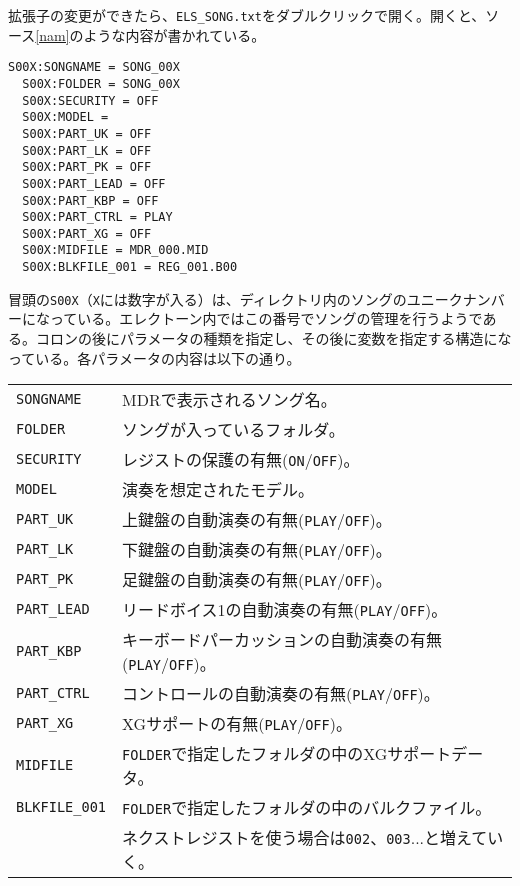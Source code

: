 \documentclass[uplatex, 10pt, dvipdfmx]{jsarticle}
\numberwithin{equation}{section}
\begin{document}
拡張子の変更ができたら、\texttt{ELS_SONG.txt}をダブルクリックで開く。開くと、ソース\ref{nam}のような内容が書かれている。
\begin{lstlisting}[caption=ELS\_SONG.NAM（変更前）, label=nam]
  S00X:SONGNAME = SONG_00X 
  S00X:FOLDER = SONG_00X 
  S00X:SECURITY = OFF 
  S00X:MODEL =  
  S00X:PART_UK = OFF 
  S00X:PART_LK = OFF 
  S00X:PART_PK = OFF 
  S00X:PART_LEAD = OFF 
  S00X:PART_KBP = OFF 
  S00X:PART_CTRL = PLAY 
  S00X:PART_XG = OFF 
  S00X:MIDFILE = MDR_000.MID 
  S00X:BLKFILE_001 = REG_001.B00 
\end{lstlisting}
冒頭の\texttt{S00X}（\texttt{X}には数字が入る）は、ディレクトリ内のソングのユニークナンバーになっている。エレクトーン内ではこの番号でソングの管理を行うようである。コロンの後にパラメータの種類を指定し、その後に変数を指定する構造になっている。各パラメータの内容は以下の通り\cite{elspc}。\\

\begin{tabular}{ll}
\texttt{SONGNAME} & MDRで表示されるソング名。 \\
\texttt{FOLDER} & ソングが入っているフォルダ。　\\
\texttt{SECURITY} & レジストの保護の有無(\texttt{ON}/\texttt{OFF})。\\
\texttt{MODEL} & 演奏を想定されたモデル。\\
\texttt{PART_UK} & 上鍵盤の自動演奏の有無(\texttt{PLAY}/\texttt{OFF})。\\
\texttt{PART_LK} & 下鍵盤の自動演奏の有無(\texttt{PLAY}/\texttt{OFF})。\\
\texttt{PART_PK} & 足鍵盤の自動演奏の有無(\texttt{PLAY}/\texttt{OFF})。\\
\texttt{PART_LEAD} & リードボイス1の自動演奏の有無(\texttt{PLAY}/\texttt{OFF})。\\
\texttt{PART_KBP} & キーボードパーカッションの自動演奏の有無(\texttt{PLAY}/\texttt{OFF})。\\
\texttt{PART_CTRL} & コントロールの自動演奏の有無(\texttt{PLAY}/\texttt{OFF})。\\
\texttt{PART_XG} & XGサポートの有無(\texttt{PLAY}/\texttt{OFF})。\\
\texttt{MIDFILE} & \texttt{FOLDER}で指定したフォルダの中のXGサポートデータ。\\
\texttt{BLKFILE_001} & \texttt{FOLDER}で指定したフォルダの中のバルクファイル。\\
 & ネクストレジストを使う場合は\texttt{002}、\texttt{003}...と増えていく。
\end{tabular}
 \\
\end{document}
